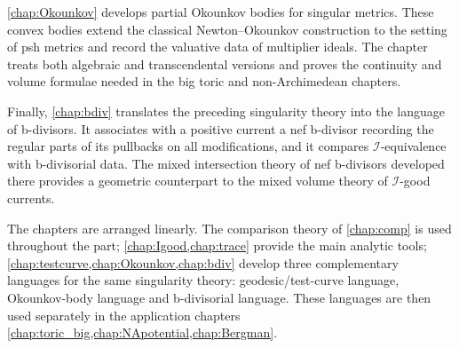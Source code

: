 \begin{partbacktext}
\cref{chap:Okounkov} develops partial Okounkov bodies for singular metrics. These convex bodies extend the classical Newton--Okounkov construction to the setting of psh metrics and record the valuative data of multiplier ideals. The chapter treats both algebraic and transcendental versions and proves the continuity and volume formulae needed in the big toric and non-Archimedean chapters.

Finally, \cref{chap:bdiv} translates the preceding singularity theory into the language of b-divisors. It associates with a positive current a nef b-divisor recording the regular parts of its pullbacks on all modifications, and it compares $\mathcal I$-equivalence with b-divisorial data. The mixed intersection theory of nef b-divisors developed there provides a geometric counterpart to the mixed volume theory of $\mathcal I$-good currents.

The chapters are arranged linearly. The comparison theory of \cref{chap:comp} is used throughout the part; \cref{chap:Igood,chap:trace} provide the main analytic tools; \cref{chap:testcurve,chap:Okounkov,chap:bdiv} develop three complementary languages for the same singularity theory: geodesic/test-curve language, Okounkov-body language and b-divisorial language. These languages are then used separately in the application chapters \cref{chap:toric_big,chap:NApotential,chap:Bergman}.
\end{partbacktext}
